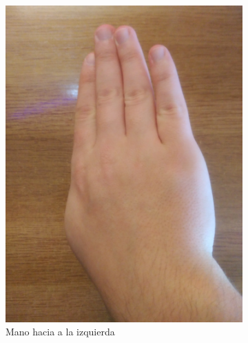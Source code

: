 \documentclass[a4paper,11pt]{article}
\begin{document}
\begin{figure}[!h]
\begin{subfigure}{0.33\textwidth}
		\includegraphics[scale=0.044]{./Imagenes/rota_horario.jpg}
		\caption{Mano hacia a la izquierda}
	\end{subfigure}
	\begin{subfigure}{0.33\textwidth}
		\centering

\end{subfigure}
\end{figure}
\end{document}
